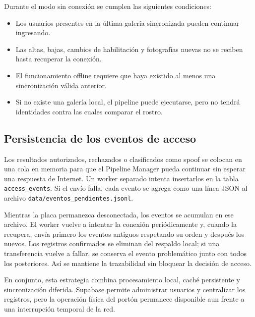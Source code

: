 Durante el modo sin conexión se cumplen las siguientes condiciones:

\begin{itemize}
    \item Los usuarios presentes en la última galería sincronizada pueden continuar ingresando.
    \item Las altas, bajas, cambios de habilitación y fotografías nuevas no se reciben hasta recuperar la conexión.
    \item El funcionamiento offline requiere que haya existido al menos una sincronización válida anterior.
    \item Si no existe una galería local, el pipeline puede ejecutarse, pero no tendrá identidades contra las cuales comparar el rostro.
\end{itemize}

\subsection{Persistencia de los eventos de acceso}
\label{sec:eventos}

Los resultados autorizados, rechazados o clasificados como spoof se colocan en una cola en memoria para que el Pipeline Manager pueda continuar sin esperar una respuesta de Internet. Un worker separado intenta insertarlos en la tabla \texttt{access\_events}. Si el envío falla, cada evento se agrega como una línea JSON al archivo \texttt{data/eventos\_pendientes.jsonl}.

Mientras la placa permanezca desconectada, los eventos se acumulan en ese archivo. El worker vuelve a intentar la conexión periódicamente y, cuando la recupera, envía primero los eventos antiguos respetando su orden y después los nuevos. Los registros confirmados se eliminan del respaldo local; si una transferencia vuelve a fallar, se conserva el evento problemático junto con todos los posteriores. Así se mantiene la trazabilidad sin bloquear la decisión de acceso.

En conjunto, esta estrategia combina procesamiento local, caché persistente y sincronización diferida. Supabase permite administrar usuarios y centralizar los registros, pero la operación física del portón permanece disponible aun frente a una interrupción temporal de la red.
